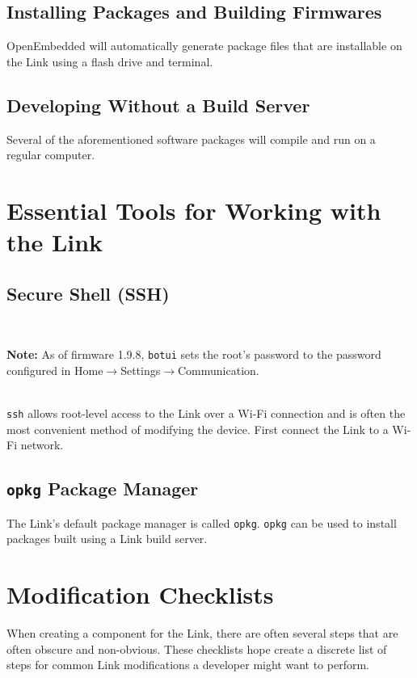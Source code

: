\documentclass[12pt,letterpaper]{article}
\newcommand{\bcolorbox}[4]{\noindent \\ \fcolorbox{#1}{#2} {\parbox{\textwidth}{\vspace{.1em}\textbf{#3} #4\vspace{.1em}}} \\}
\newcommand{\note}[1]{\bcolorbox{yellow}{Seashell}{Note:}{#1}}
\begin{document}
	\subsection{Installing Packages and Building Firmwares}
	OpenEmbedded will automatically generate package files that are installable on the Link using a flash drive and terminal.
	
	\subsection{Developing Without a Build Server}
	Several of the aforementioned software packages will compile and run on a regular computer.
	
	\section{Essential Tools for Working with the Link}
	
	\subsection{Secure Shell (SSH)}
	\note{As of firmware 1.9.8, \texttt{botui} sets the root's password to the password configured in
	Home$\rightarrow$Settings$\rightarrow$Communication.}
	
	\texttt{ssh} allows root-level access to the Link over a Wi-Fi connection and is often the most convenient method of
	modifying the device. First connect the Link to a Wi-Fi network.
	
	\subsection{\texttt{opkg} Package Manager}
	The Link's default package manager is called \texttt{opkg}. \texttt{opkg} can be used to install packages built using
	a Link build server.
	
	\section{Modification Checklists}
	When creating a component for the Link, there are often several steps that are often obscure and non-obvious. These checklists
	hope create a discrete list of steps for common Link modifications a developer might want to perform.
	
\end{document}

